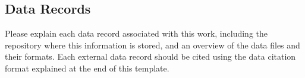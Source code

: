 \subsection{Data Records}

Please explain each data record associated with this work, including the repository where this information is stored, and an overview of the data files and their formats. Each external data record should be cited using the data citation format explained at the end of this template. 